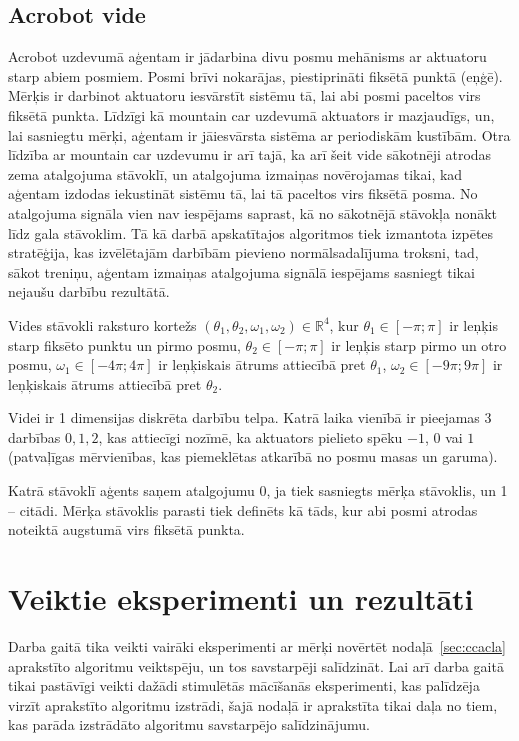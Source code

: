 \documentclass{ludis} %
\begin{document}
\subsection{Acrobot vide}
Acrobot uzdevumā aģentam ir jādarbina divu posmu mehānisms ar aktuatoru starp
abiem posmiem. Posmi brīvi nokarājas, piestiprināti fiksētā punktā (eņģē).
Mērķis ir darbinot aktuatoru iesvārstīt sistēmu tā, lai abi posmi paceltos virs
fiksētā punkta. Līdzīgi kā mountain car uzdevumā aktuators ir mazjaudīgs, un,
lai sasniegtu mērķi, aģentam ir jāiesvārsta sistēma ar periodiskām kustībām.
Otra līdzība ar mountain car uzdevumu ir arī tajā, ka arī šeit vide sākotnēji
atrodas zema atalgojuma stāvoklī, un atalgojuma izmaiņas novērojamas tikai, kad
aģentam izdodas iekustināt sistēmu tā, lai tā paceltos virs fiksētā posma.
No atalgojuma signāla vien nav iespējams saprast, kā no sākotnējā stāvokļa
nonākt līdz gala stāvoklim. Tā kā darbā apskatītajos algoritmos tiek izmantota
izpētes stratēģija, kas izvēlētajām darbībām pievieno normālsadalījuma troksni,
tad, sākot treniņu, aģentam izmaiņas atalgojuma signālā iespējams sasniegt tikai
nejaušu darbību rezultātā.

Vides stāvokli raksturo kortežs $(\theta_1, \theta_2, \omega_1, \omega_2) \in
\mathbb{R}^4$, kur $\theta_1 \in [-\pi; \pi]$ ir leņķis starp fiksēto punktu un
pirmo posmu, $\theta_2 \in [-\pi; \pi]$ ir leņķis starp pirmo un otro posmu,
$\omega_1 \in [-4\pi; 4\pi]$ ir leņķiskais ātrums attiecībā pret $\theta_1$,
$\omega_2 \in [-9\pi; 9\pi]$ ir leņķiskais ātrums attiecībā pret $\theta_2$.

Videi ir 1 dimensijas diskrēta darbību telpa. Katrā laika vienībā ir pieejamas 3
darbības ${0, 1, 2}$, kas attiecīgi nozīmē, ka aktuators pielieto spēku $-1$,
$0$ vai $1$ (patvaļīgas mērvienības, kas piemeklētas atkarībā no posmu masas un
garuma).

Katrā stāvoklī aģents saņem atalgojumu 0, ja tiek sasniegts mērķa stāvoklis, un 1
-- citādi. Mērķa stāvoklis parasti tiek definēts kā tāds, kur abi posmi atrodas
noteiktā augstumā virs fiksētā punkta.




\section{Veiktie eksperimenti un rezultāti}\label{sec:exp}
Darba gaitā tika veikti vairāki eksperimenti ar mērķi novērtēt
nodaļā~\ref{sec:ccacla} aprakstīto algoritmu veiktspēju, un tos savstarpēji
salīdzināt. Lai arī darba gaitā tikai pastāvīgi veikti dažādi stimulētās
mācīšanās eksperimenti, kas palīdzēja virzīt aprakstīto algoritmu izstrādi, šajā
nodaļā ir aprakstīta tikai daļa no tiem, kas parāda izstrādāto algoritmu
savstarpējo salīdzinājumu.
\end{document}
